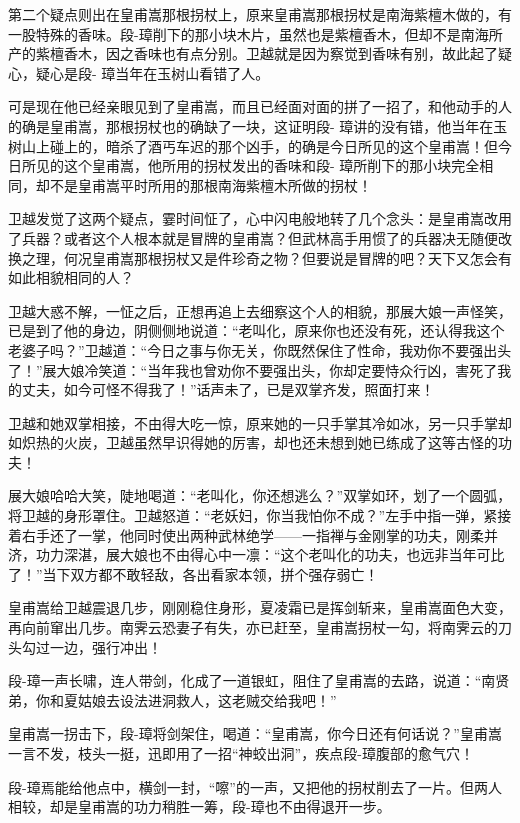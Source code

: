 \documentclass[12pt,oneside]{book}
\begin{document}
第二个疑点则出在皇甫嵩那根拐杖上，原来皇甫嵩那根拐杖是南海紫檀木做的，有一股特殊的香味。段-璋削下的那小块木片，虽然也是紫檀香木，但却不是南海所产的紫檀香木，因之香味也有点分别。卫越就是因为察觉到香味有别，故此起了疑心，疑心是段-
璋当年在玉树山看错了人。

可是现在他已经亲眼见到了皇甫嵩，而且已经面对面的拼了一招了，和他动手的人的确是皇甫嵩，那根拐杖也的确缺了一块，这证明段-
璋讲的没有错，他当年在玉树山上碰上的，暗杀了酒丐车迟的那个凶手，的确是今日所见的这个皇甫嵩！但今日所见的这个皇甫嵩，他所用的拐杖发出的香味和段-
璋所削下的那小块完全相同，却不是皇甫嵩平时所用的那根南海紫檀木所做的拐杖！

卫越发觉了这两个疑点，霎时间怔了，心中闪电般地转了几个念头：是皇甫嵩改用了兵器？或者这个人根本就是冒牌的皇甫嵩？但武林高手用惯了的兵器决无随便改换之理，何况皇甫嵩那根拐杖又是件珍奇之物？但要说是冒牌的吧？天下又怎会有如此相貌相同的人？

卫越大惑不解，一怔之后，正想再追上去细察这个人的相貌，那展大娘一声怪笑，已是到了他的身边，阴侧侧地说道：``老叫化，原来你也还没有死，还认得我这个老婆子吗？''卫越道：``今日之事与你无关，你既然保住了性命，我劝你不要强出头了！''展大娘冷笑道：``当年我也曾劝你不要强出头，你却定要恃众行凶，害死了我的丈夫，如今可怪不得我了！''话声未了，已是双掌齐发，照面打来！

卫越和她双掌相接，不由得大吃一惊，原来她的一只手掌其冷如冰，另一只手掌却如炽热的火炭，卫越虽然早识得她的厉害，却也还未想到她已练成了这等古怪的功夫！

展大娘哈哈大笑，陡地喝道：``老叫化，你还想逃么？''双掌如环，划了一个圆弧，将卫越的身形罩住。卫越怒道：``老妖妇，你当我怕你不成？''左手中指一弹，紧接着右手还了一掌，他同时使出两种武林绝学------一指禅与金刚掌的功夫，刚柔并济，功力深湛，展大娘也不由得心中一凛：``这个老叫化的功夫，也远非当年可比了！''当下双方都不敢轻敌，各出看家本领，拼个强存弱亡！

皇甫嵩给卫越震退几步，刚刚稳住身形，夏凌霜已是挥剑斩来，皇甫嵩面色大变，再向前窜出几步。南霁云恐妻子有失，亦已赶至，皇甫嵩拐杖一勾，将南霁云的刀头勾过一边，强行冲出！

段-璋一声长啸，连人带剑，化成了一道银虹，阻住了皇甫嵩的去路，说道：``南贤弟，你和夏姑娘去设法进洞救人，这老贼交给我吧！''

皇甫嵩一拐击下，段-璋将剑架住，喝道：``皇甫嵩，你今日还有何话说？''皇甫嵩一言不发，枝头一挺，迅即用了一招``神蛟出洞''，疾点段-璋腹部的愈气穴！

段-璋焉能给他点中，横剑一封，``嚓''的一声，又把他的拐杖削去了一片。但两人相较，却是皇甫嵩的功力稍胜一筹，段-璋也不由得退开一步。
\end{document}
